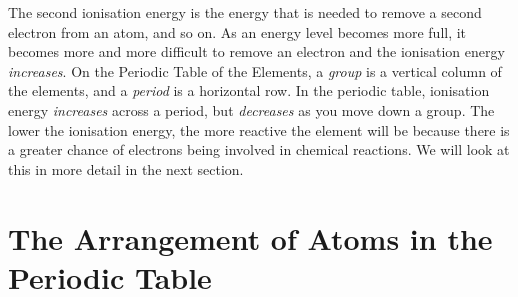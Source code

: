The second ionisation energy is the energy that is needed to remove a second electron from an atom, and so on. As an energy level becomes more full, it becomes more and more difficult to remove an electron and the ionisation energy \textit{increases}. On the Periodic Table of the Elements, a \textit{group} is a vertical column of the elements, and a \textit{period} is a horizontal row. In the periodic table, ionisation energy \textit{increases} across a period, but \textit{decreases} as you move down a group. The lower the ionisation energy, the more reactive the element will be because there is a greater chance of electrons being involved in chemical reactions. We will look at this in more detail in the next section.








\section{The Arrangement of Atoms in the Periodic Table}
\label{sec:atom:periodic}


